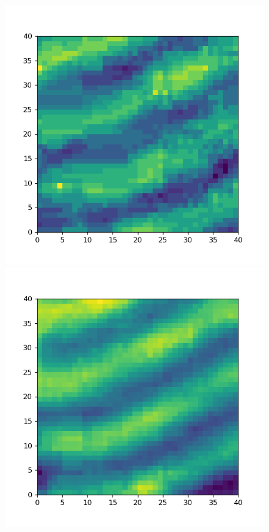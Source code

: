 \documentclass[letterpaper, 10 pt, conference]{ieeeconf}  %
\begin{document}
\begin{figure}[!t]
  \includegraphics[width=\linewidth]{images/movie_gold.png}
\endminipage\hfill
{}
  \includegraphics[width=\linewidth]{images/movie_dmd.png}

\end{figure}
\end{document}
